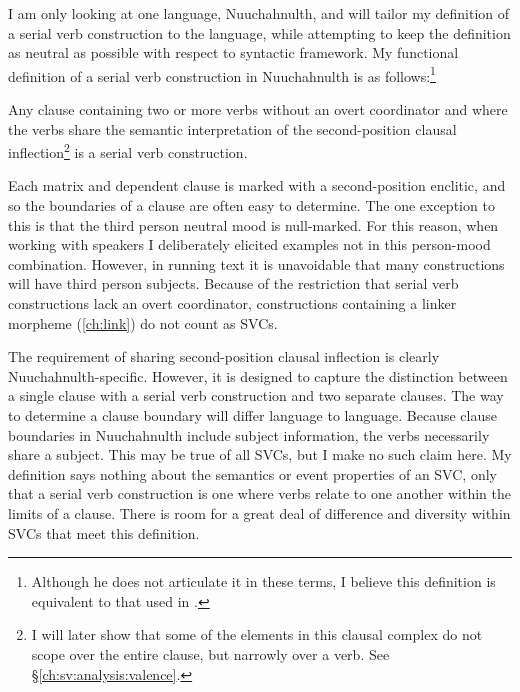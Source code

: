 I am only looking at one language, Nuuchahnulth, and will tailor my definition of a serial verb construction to the language, while attempting to keep the definition as neutral as possible with respect to syntactic framework.
My functional definition of a serial verb construction in Nuuchahnulth is as follows:\footnote{Although he does not articulate it in these terms, I believe this definition is equivalent to that used in \citet[p.~97--113]{nakayama2001}.}

\ex \label{svcdef}
Any clause containing two or more verbs without an overt coordinator and where the verbs share the semantic interpretation of the second-position clausal inflection\footnote{I will later show that some of the elements in this clausal complex do not scope over the entire clause, but narrowly over a verb. See \S\ref{ch:sv:analysis:valence}.} is a serial verb construction.
\xe

Each matrix and dependent clause is marked with a second-position enclitic, and so the boundaries of a clause are often easy to determine. The one exception to this is that the third person neutral mood is null-marked. For this reason, when working with speakers I deliberately elicited examples not in this person-mood combination. However, in running text it is unavoidable that many constructions will have third person subjects. Because of the restriction that serial verb constructions lack an overt coordinator, constructions containing a linker morpheme (\cref{ch:link}) do not count as SVCs.

The requirement of sharing second-position clausal inflection is clearly Nuuchahnulth-specific. However, it is designed to capture the distinction between a single clause with a serial verb construction and two separate clauses. The way to determine a clause boundary will differ language to language. Because clause boundaries in Nuuchahnulth include subject information, the verbs necessarily share a subject. This may be true of all SVCs, but I make no such claim here. My definition says nothing about the semantics or event properties of an SVC, only that a serial verb construction is one where verbs relate to one another within the limits of a clause. There is room for a great deal of difference and diversity within SVCs that meet this definition.%


